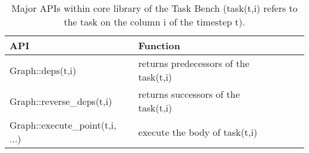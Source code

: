 \begin{table}[t]
\small
\begin{tabular}{l | l | l | l | l}
API & Function \\
\hline
Graph::deps(t,i) & returns predecessors of the task(t,i) \\
Graph::reverse\_deps(t,i) & returns successors of the task(t,i)\\
Graph::execute\_point(t,i, ...) & execute the body of task(t,i) \\
\end{tabular}

\caption{Major APIs within core library of the Task Bench (task(t,i) refers to the task on the column i of the timestep t).\label{tab:api}}
\vspace{-0.5cm}
\end{table}
